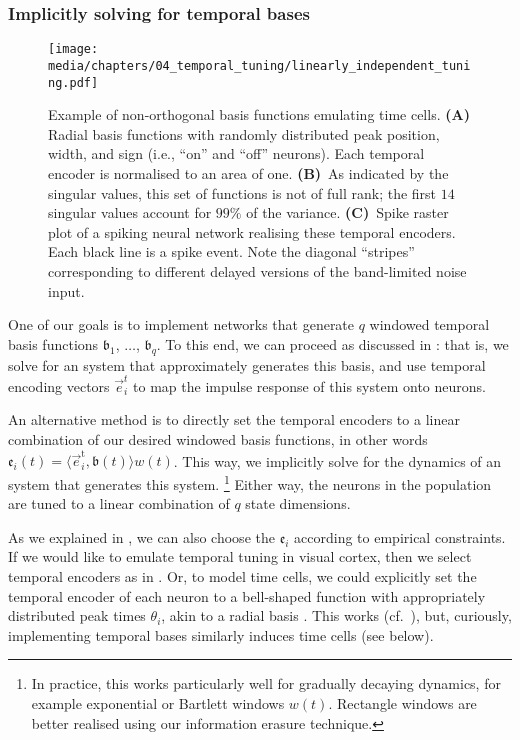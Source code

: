 \subsubsection{Implicitly solving for temporal bases}

\begin{figure}
	\centering
	\texttt{[image: media/chapters/04\_temporal\_tuning/linearly\_independent\_tuning.pdf]}%
	{\label{fig:linearly_independent_tuning_a}}%
	{\label{fig:linearly_independent_tuning_b}}%
	{\label{fig:linearly_independent_tuning_c}}%
	\caption[Example of non-orthogonal basis functions emulating time cells]{Example of non-orthogonal basis functions emulating time cells.
	\textbf{(A)} Radial basis functions with randomly distributed peak position, width, and sign (i.e., \enquote{on} and \enquote{off} neurons).
	Each temporal encoder is normalised to an area of one.
\textbf{(B)}~As indicated by the singular values, this set of functions is not of full rank; the first $14$ singular values account for $99\%$ of the variance.
\textbf{(C)}~Spike raster plot of a spiking neural network realising these temporal encoders. Each black line is a spike event. Note the diagonal \enquote{stripes} corresponding to different delayed versions of the band-limited noise input.
}
	\label{fig:linearly_independent_tuning}
\end{figure}

One of our goals is to implement networks that generate $q$ windowed temporal basis functions $\mathfrak{b}_1$, $\ldots$, $\mathfrak{b}_q$.
To this end, we can proceed as discussed in : that is, we solve for an \LTI system that approximately generates this basis, and use temporal encoding vectors $\vec{e}^t_i$ to map the impulse response of this system onto neurons.

An alternative method is to directly set the temporal encoders to a linear combination of our desired windowed basis functions, in other words $\mathfrak{e}_i(t) = \langle \vec{e}^\mathrm{t}_i, \mathfrak{b}(t) \rangle  w(t)$.
This way, we implicitly solve for the dynamics of an \LTI system that generates this system.%
\footnote{In practice, this works particularly well for gradually decaying dynamics, for example exponential or Bartlett windows $w(t)$. Rectangle windows are better realised using our information erasure technique.}
Either way, the neurons in the population are tuned to a linear combination of $q$ state dimensions.

As we explained in , we can also choose the $\mathfrak{e}_i$ according to empirical constraints.
If we would like to emulate temporal tuning in visual cortex, then we select temporal encoders as in .
Or, to model time cells, we could explicitly set the temporal encoder of each neuron to a bell-shaped function with appropriately distributed peak times $\theta_i$, akin to a radial basis \citep{broomhead1988radial,stockel2020assorted}.
This works (cf.~), but, curiously, implementing temporal bases similarly induces time cells (see below).

